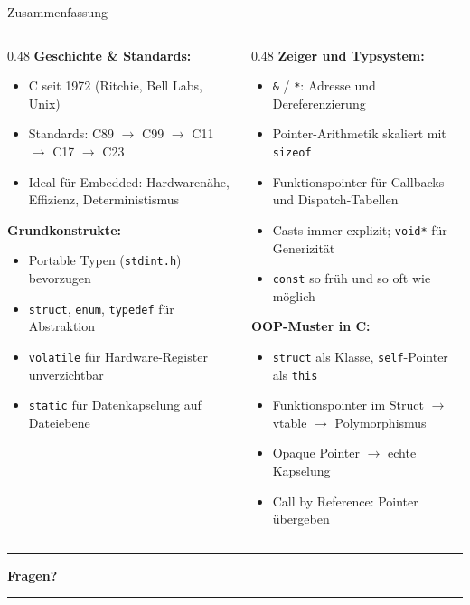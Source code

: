 \documentclass[%
  aspectratio=169,
  10pt
]{beamer}
\begin{document}
\begin{frame}{Zusammenfassung}
  \begin{columns}[T]
    \begin{column}{0.48\textwidth}
      \textbf{Geschichte \& Standards:}
      \begin{itemize}
        \item C seit 1972 (Ritchie, Bell Labs, Unix)
        \item Standards: C89 $\to$ C99 $\to$ C11 $\to$ C17 $\to$ C23
        \item Ideal für Embedded: Hardwarenähe, Effizienz, Deterministismus
      \end{itemize}
      \textbf{Grundkonstrukte:}
      \begin{itemize}
        \item Portable Typen (\texttt{stdint.h}) bevorzugen
        \item \texttt{struct}, \texttt{enum}, \texttt{typedef} für Abstraktion
        \item \texttt{volatile} für Hardware-Register unverzichtbar
        \item \texttt{static} für Datenkapselung auf Dateiebene
      \end{itemize}
    \end{column}
    \begin{column}{0.48\textwidth}
      \textbf{Zeiger und Typsystem:}
      \begin{itemize}
        \item \texttt{\&} / \texttt{*}: Adresse und Dereferenzierung
        \item Pointer-Arithmetik skaliert mit \texttt{sizeof}
        \item Funktionspointer für Callbacks und Dispatch-Tabellen
        \item Casts immer explizit; \texttt{void*} für Generizität
        \item \texttt{const} so früh und so oft wie möglich
      \end{itemize}
      \textbf{OOP-Muster in C:}
      \begin{itemize}
        \item \texttt{struct} als Klasse, \texttt{self}-Pointer als \texttt{this}
        \item Funktionspointer im Struct $\to$ vtable $\to$ Polymorphismus
        \item Opaque Pointer $\to$ echte Kapselung
        \item Call by Reference: Pointer übergeben
      \end{itemize}
    \end{column}
  \end{columns}

  \vspace{0.6em}
  \begin{center}
    \large\color{fbblau}\rule{0.4\textwidth}{0.4pt}\quad
    \textbf{Fragen?}
    \quad\rule{0.4\textwidth}{0.4pt}
  \end{center}
\end{frame}

\end{document}
